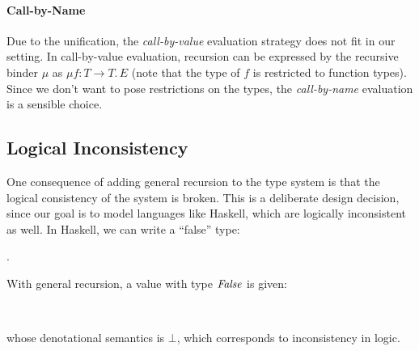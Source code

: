 \paragraph{Call-by-Name}
Due to the unification, the \emph{call-by-value} evaluation strategy
does not fit in our setting. In call-by-value evaluation, recursion
can be expressed by the recursive binder $\mu$ as $\mu f : T
\rightarrow T.\, E$ (note that the type of $f$ is restricted to
function types). Since we don't want to pose restrictions on the
types, the \emph{call-by-name} evaluation is a sensible choice.

\subsection{Logical Inconsistency}

  

One consequence of adding general recursion to the type system is that
the logical consistency of the system is broken. This is a deliberate
design decision, since our goal is to model languages like Haskell,
which are logically inconsistent as well. In Haskell, we can write a
``false'' type:
\begin{hscode}\SaveRestoreHook
{}%
%
%
\>[3]{}\;\mathrel{=}\;.\,\<[E]%
\ColumnHook
\end{hscode}\resethooks
With general recursion, a value with type \ensuremath{\Conid{False}} is given:
\begin{hscode}\SaveRestoreHook
{}%
%
%
\>[3]{}\mathbin{::}\<[E]%
\\
\>[3]{}\mathrel{=}\<[E]%
\ColumnHook
\end{hscode}\resethooks
whose denotational semantics is \ensuremath{\bot }, which corresponds to
inconsistency in logic.

